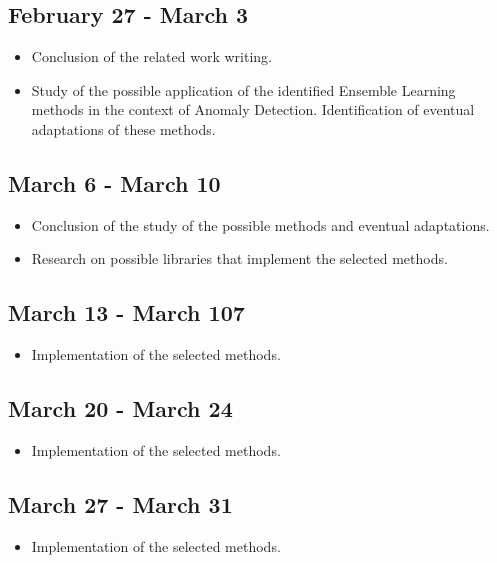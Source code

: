\subsection{February 27 - March 3}

\begin{itemize}
	\item Conclusion of the related work writing.
	\item Study of the possible application of the identified Ensemble Learning methods in the context of Anomaly Detection. Identification of eventual adaptations of these methods.
\end{itemize}

\subsection{March 6 - March 10}

\begin{itemize}
	\item Conclusion of the study of the possible methods and eventual adaptations.
	\item Research on possible libraries that implement the selected methods.
\end{itemize}

\subsection{March 13 - March 107}

\begin{itemize}
	\item Implementation of the selected methods.
\end{itemize}

\subsection{March 20 - March 24}

\begin{itemize}
	\item Implementation of the selected methods.
\end{itemize}

\subsection{March 27 - March 31}

\begin{itemize}
	\item Implementation of the selected methods.
\end{itemize}

